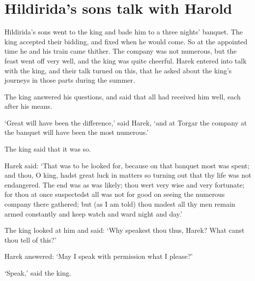 \chapter{Hildirida's sons talk with Harold}
Hildirida's sons went to the king and bade him to a three nights' banquet. The king accepted their bidding, and fixed when he would come. So at the appointed time he and his train came thither. The company was not numerous, but the feast went off very well, and the king was quite cheerful. Harek entered into talk with the king, and their talk turned on this, that he asked about the king's journeys in those parts during the summer.

The king answered his questions, and said that all had received him well, each after his means.

`Great will have been the difference,' said Harek, `and at Torgar the company at the banquet will have been the most numerous.'

The king said that it was so.

Harek said: `That was to be looked for, because on that banquet most was spent; and thou, O king, hadst great luck in matters so turning out that thy life was not endangered. The end was as was likely; thou wert very wise and very fortunate; for thou at once suspectedst all was not for good on seeing the numerous company there gathered; but (as I am told) thou madest all thy men remain armed constantly and keep watch and ward night and day.'

The king looked at him and said: `Why speakest thou thus, Harek? What canst thou tell of this?'

Harek answered: `May I speak with permission what I please?'

`Speak,' said the king.

